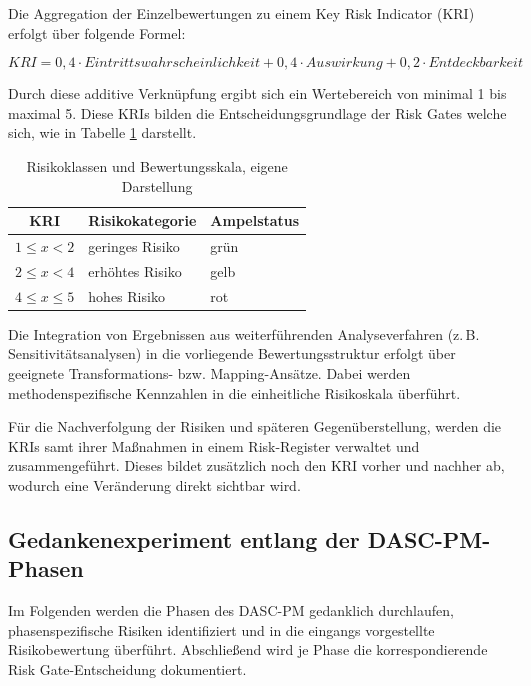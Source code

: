 Die Aggregation der Einzelbewertungen zu einem Key Risk Indicator (KRI) erfolgt über folgende Formel:

\begin{equation}
KRI = 0{,}4 \cdot Eintrittswahrscheinlichkeit + 0{,}4 \cdot Auswirkung + 0{,}2 \cdot Entdeckbarkeit
\end{equation}

Durch diese additive Verknüpfung ergibt sich ein Wertebereich von minimal 1 bis maximal 5. 
Diese KRIs bilden die Entscheidungsgrundlage der Risk Gates welche sich, 
wie in Tabelle \ref{tab:risikoklassen} darstellt.

\begin{table}[H]
    \centering
    \label{tab:risikoklassen}
    \begin{tabular}{c l l}
    \hline
    \textbf{KRI} & \textbf{Risikokategorie} & \textbf{Ampelstatus} \\
    \hline
    $1 \leq x < 2$ & geringes Risiko        & grün \\
    $2 \leq x < 4$ & erhöhtes Risiko       & gelb \\
    $4 \leq x \leq 5$ & hohes Risiko          & rot \\
    \hline
    \end{tabular}
    \caption{Risikoklassen und Bewertungsskala, eigene Darstellung}
\end{table}

Die Integration von Ergebnissen aus weiterführenden Analyseverfahren 
(z.\,B. Sensitivitätsanalysen) in die vorliegende Bewertungsstruktur erfolgt 
über geeignete Transformations- bzw. Mapping-Ansätze. 
Dabei werden methodenspezifische Kennzahlen in die einheitliche Risikoskala überführt. 

Für die Nachverfolgung der Risiken und späteren Gegenüberstellung, werden die KRIs samt 
ihrer Maßnahmen in einem Risk-Register verwaltet und zusammengeführt. Dieses bildet 
zusätzlich noch den KRI vorher und nachher ab, wodurch eine Veränderung direkt sichtbar wird.

\subsection{Gedankenexperiment entlang der DASC-PM-Phasen}

Im Folgenden werden die Phasen des DASC-PM gedanklich durchlaufen, phasenspezifische
Risiken identifiziert und in die eingangs vorgestellte Risikobewertung überführt.
Abschließend wird je Phase die korrespondierende Risk Gate-Entscheidung dokumentiert.

